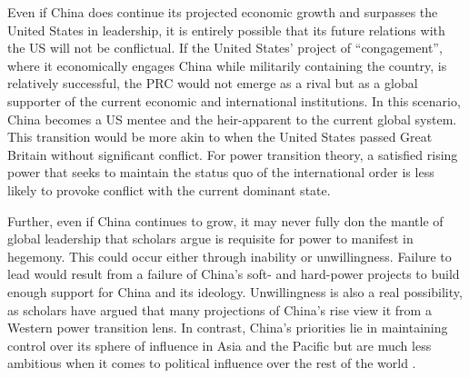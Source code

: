 Even if China does continue its projected economic growth and surpasses the United States in leadership, it is entirely possible that its future relations with the US will not be conflictual. If the United States' project of ``congagement'', where it economically engages China while militarily containing the country, is relatively successful, the PRC would not emerge as a rival but as a global supporter of the current economic and international institutions.\cite{Khalilzad1999} In this scenario, China becomes a US mentee and the heir-apparent to the current global system. This transition would be more akin to when the United States passed Great Britain without significant conflict. For power transition theory, a satisfied rising power that seeks to maintain the status quo of the international order is less likely to provoke conflict with the current dominant state.\cite[][We do note the very different context of the transition in global leadership between the UK and the US, which happens after two disastrous wars in which the potential competitors are allies and not adversaries. Additionally, there is not a scholarly consensus on whether such a transition is even feasible.]{Organski1980,Efird2003,layne2018} 


Further, even if China continues to grow, it may never fully don the mantle of global leadership that scholars argue is requisite for power to manifest in hegemony.\cite{kindleberger1973} This could occur either through inability or unwillingness. Failure to lead would result from a failure of China's soft- and hard-power projects to build enough support for China and its ideology. Unwillingness is also a real possibility, as scholars have argued that many projections of China's rise view it from a Western power transition lens. In contrast, China's priorities lie in maintaining control over its sphere of influence in Asia and the Pacific but are much less ambitious when it comes to political influence over the rest of the world \cite{Chan2017}.  



